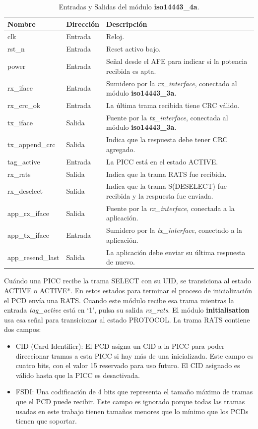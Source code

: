 \documentclass[a4paper, twoside, 11pt]{report}
\begin{document}
\begin{table}[htb]
  \centering
  \tablezebra
  \begin{tabulary}{\linewidth}{l|l|L}
    \setcounter{rownum}{0}
    \textbf{Nombre}&\textbf{Dirección}&\textbf{Descripción} \\
    \hline
    clk&Entrada&Reloj. \\
    rst\_n&Entrada&Reset activo bajo. \\
    power&Entrada&Señal desde el AFE para indicar si la potencia recibida es apta. \\
    rx\_iface&Entrada&Sumidero por la \textit{rx\_interface}, conectado al módulo \textbf{iso14443\_3a}. \\
    rx\_crc\_ok&Entrada&La última trama recibida tiene CRC válido. \\
    tx\_iface&Salida&Fuente por la \textit{tx\_interface}, conectada al módulo \textbf{iso14443\_3a}. \\
    tx\_append\_crc&Salida&Indica que la respuesta debe tener CRC agregado. \\
    tag\_active&Entrada&La PICC está en el estado ACTIVE. \\
    rx\_rats&Salida&Indica que la trama RATS fue recibida. \\
    rx\_deselect&Salida&Indica que la trama S(DESELECT) fue recibida y la respuesta fue enviada. \\
    app\_rx\_iface&Salida&Fuente por la \textit{rx\_interface}, conectada a la aplicación. \\
    app\_tx\_iface&Entrada&Sumidero por la \textit{tx\_interface}, conectado a la aplicación. \\
    app\_resend\_last&Salida&La aplicación debe enviar su última respuesta de nuevo. \\
  \end{tabulary}
  \caption{Entradas y Salidas del módulo \textbf{iso14443\_4a}.}
  \label{tab:ports_iso14443_4a}
\end{table}

Cuándo una PICC recibe la trama SELECT con su UID, se transiciona al estado ACTIVE o ACTIVE*. En estos estados para terminar el proceso de inicialización el PCD envía una RATS. Cuando este módulo recibe esa trama mientras la entrada \textit{tag\_active} está en ‘1’, pulsa su salida \textit{rx\_rats}. El módulo \textbf{initialisation} usa esa señal para transicionar al estado PROTOCOL. La trama RATS contiene dos campos:

\begin{itemize}
  \item CID (Card Identifier): El PCD asigna un CID a la PICC para poder direccionar tramas a esta PICC si hay más de una inicializada. Este campo es cuatro bits, con el valor 15 reservado para uso futuro. El CID asignado es válido hasta que la PICC es desactivada.
  \item FSDI: Una codificación de 4 bits que representa el tamaño máximo de tramas que el PCD puede recibir. Este campo es ignorado porque todas las tramas usadas en este trabajo tienen tamaños menores que lo mínimo que los PCDs tienen que soportar.
\end{itemize}
\end{document}
